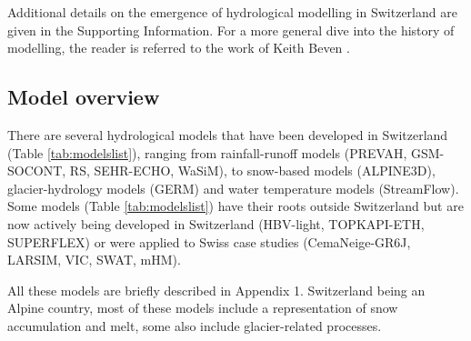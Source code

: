 \documentclass[10pt,a4paper]{article}
\begin{document}
Additional details on the emergence of hydrological modelling in Switzerland are given in the Supporting Information. For a more general dive into the history of modelling, the reader is referred to the work of Keith Beven \citep{Beven2020,Beven2020a}.


\subsection{Model overview}
\label{sec:models:overview}

There are several hydrological models that have been developed in Switzerland (Table \ref{tab:modelslist}), ranging from rainfall-runoff models (PREVAH, GSM-SOCONT, RS, SEHR-ECHO, WaSiM), to snow-based models (ALPINE3D), glacier-hydrology models (GERM) and water temperature models (StreamFlow). Some models (Table \ref{tab:modelslist}) have their roots outside Switzerland but are now actively being developed in Switzerland (HBV-light, TOPKAPI-ETH, SUPERFLEX) or were applied to Swiss case studies (CemaNeige-GR6J, LARSIM, VIC, SWAT, mHM). 

All these models are briefly described in Appendix 1. Switzerland being an Alpine country, most of these models include a representation of snow accumulation and melt, some also include glacier-related processes.
\end{document}
